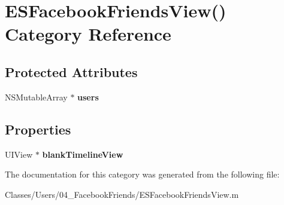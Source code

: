 \hypertarget{category_e_s_facebook_friends_view_07_08}{}\section{E\+S\+Facebook\+Friends\+View() Category Reference}
\label{category_e_s_facebook_friends_view_07_08}
\subsection*{Protected Attributes}
\begin{DoxyCompactItemize}
\item 
\hypertarget{category_e_s_facebook_friends_view_07_08_ac67e35f047dc65d6bc88f20690d9659f}{}N\+S\+Mutable\+Array $\ast$ {\bfseries users}\label{category_e_s_facebook_friends_view_07_08_ac67e35f047dc65d6bc88f20690d9659f}

\end{DoxyCompactItemize}
\subsection*{Properties}
\begin{DoxyCompactItemize}
\item 
\hypertarget{category_e_s_facebook_friends_view_07_08_ad005b5c54e395b3a073fb3ab270f14f2}{}U\+I\+View $\ast$ {\bfseries blank\+Timeline\+View}\label{category_e_s_facebook_friends_view_07_08_ad005b5c54e395b3a073fb3ab270f14f2}

\end{DoxyCompactItemize}


The documentation for this category was generated from the following file\+:\begin{DoxyCompactItemize}
\item 
Classes/\+Users/04\+\_\+\+Facebook\+Friends/E\+S\+Facebook\+Friends\+View.\+m\end{DoxyCompactItemize}
